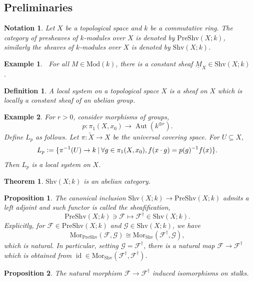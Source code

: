 \documentclass[8pt]{article}
\numberwithin{equation}{section}
\newtheorem{theorem}{Theorem} [section]
\newtheorem{proposition}{Proposition}[section]
\newtheorem{definition}{Definition}[section]
\newtheorem{notation}{Notation}[section]
\newtheorem{example}{Example}[section]
\DeclareMathOperator{\Aut}{Aut}
\DeclareMathOperator{\id}{id}
\newcommand{\defeq}{\vcentcolon=}
\newcommand{\sep}[0]{\:|\:}
\newcommand{\cF}[0]{\mathcal{F}}
\newcommand{\cG}[0]{\mathcal{G}}
\newcommand{\PreShv}[0]{\mathrm{PreShv}}
\newcommand{\Shv}[0]{\mathrm{Shv}}
\begin{document}
\subsection{Preliminaries}

\begin{notation}
    Let $X$ be a topological space and $k$ be a commutative ring. The category of presheaves of $k$-modules over $X$ is denoted by $\PreShv(X;k)$, similarly the sheaves of $k$-modules over $X$ is denoted by $\Shv(X;k)$.
\end{notation}
\begin{example}$\:$
        For all $M\in\mathrm{Mod}(k)$, there is a constant sheaf $\underline{M}_X\in\Shv(X;k)$.
\end{example}
\begin{definition}
    A local system on a topological space $X$ is a sheaf on $X$ which is locally a constant sheaf of an abelian group.
\end{definition}
\begin{example}
    For $r>0$, consider morphisms of groups,
        \begin{equation*}
            p:\pi_1(X,x_0)\to \Aut(k^{\oplus r}).
        \end{equation*}
        Define $L_p$ as follows. Let $\pi:\tilde{X}\to X$ be the universal covering space. For $U\subseteq X$, 
        \begin{equation*}
            L_p \defeq \{\pi^{-1}(U)\to k\sep \forall g\in\pi_1(X,x_0), f(x\cdot g) = p(g)^{-1}f(x)\}.
        \end{equation*}
        Then $L_p$ is a local system on $X$.
\end{example}
\begin{theorem}
    $\Shv(X;k)$ is an abelian category.
\end{theorem}

\begin{proposition}
    The canonical inclusion $\Shv(X;k)\to \PreShv(X;k)$ admits a left adjoint and such functor is called the sheafification,
    \begin{equation*}
    \PreShv(X;k)\ni \cF\mapsto\cF^\dagger\in\Shv(X;k).
    \end{equation*}
    Explicitly, for $\cF\in\PreShv(X;k)$ and $\cG\in\Shv(X;k)$, we have 
    \begin{equation*}
        \mathrm{Mor}_{\PreShv}(\cF,\cG)\cong \mathrm{Mor}_{\Shv}(\cF^\dagger,\cG),
    \end{equation*}
    which is natural. In particular, setting $\cG = \cF^\dagger$, there is a natural map $\cF\to\cF^\dagger$ which is obtained from $\id\in\mathrm{Mor}_{\Shv}(\cF^\dagger,\cF^\dagger)$.
\end{proposition}
\begin{proposition}
    The natural morphism $\cF\to \cF^\dagger$ induced isomorphisms on stalks.
\end{proposition}
\end{document}
